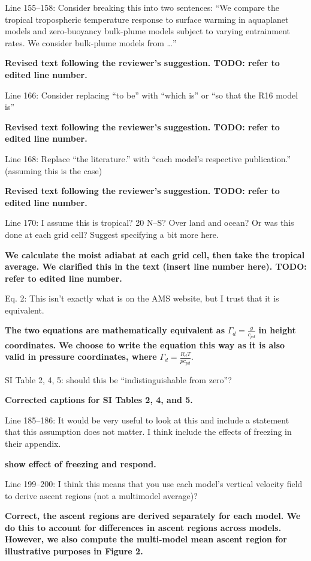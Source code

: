 \documentclass[11pt]{article}
\begin{document}
Line 155--158: Consider breaking this into two sentences: ``We compare the tropical tropospheric temperature response to surface warming in aquaplanet models and zero-buoyancy bulk-plume models subject to varying entrainment rates. We consider bulk-plume models from \ldots{}''

\textbf{Revised text following the reviewer's suggestion. TODO: refer to edited line number.}

Line 166: Consider replacing ``to be'' with ``which is'' or ``so that the R16 model is''

\textbf{Revised text following the reviewer's suggestion. TODO: refer to edited line number.}

Line 168: Replace ``the literature.'' with ``each model's respective publication.'' (assuming this is the case)

\textbf{Revised text following the reviewer's suggestion. TODO: refer to edited line number.}

Line 170: I assume this is tropical? 20 N--S? Over land and ocean? Or was this done at each grid cell? Suggest specifying a bit more here.

\textbf{We calculate the moist adiabat at each grid cell, then take the tropical average. We clarified this in the text (insert line number here). TODO: refer to edited line number.}

Eq. 2: This isn't exactly what is on the AMS website, but I trust that it is equivalent.

\textbf{The two equations are mathematically equivalent as} \(\Gamma_d=\frac{g}{c_{pd}}\) \textbf{in height coordinates. We choose to write the equation this way as it is also valid in pressure coordinates, where} \(\Gamma_d=\frac{R_dT}{pc_{pd}}\).

SI Table 2, 4, 5: should this be ``indistinguishable from zero''?

\textbf{Corrected captions for SI Tables 2, 4, and 5.}

Line 185--186: It would be very useful to look at this and include a statement that this assumption does not matter. I think \cite{flannaghan_tropical_2014} include the effects of freezing in their appendix.

\textbf{show effect of freezing and respond.}

Line 199--200: I think this means that you use each model's vertical velocity field to derive ascent regions (not a multimodel average)?

\textbf{Correct, the ascent regions are derived separately for each model. We do this to account for differences in ascent regions across models. However, we also compute the multi-model mean ascent region for illustrative purposes in Figure 2.}
\end{document}
